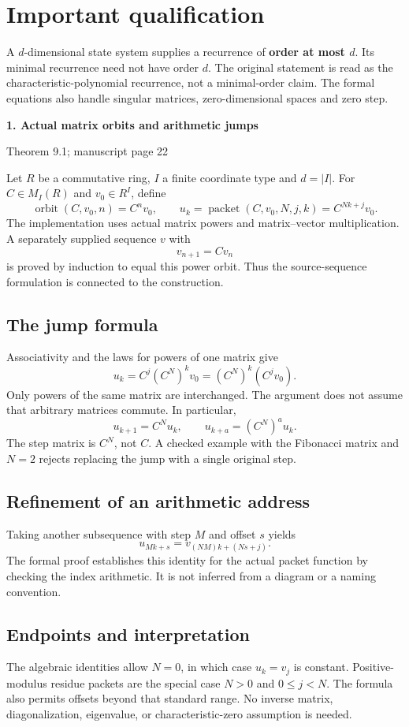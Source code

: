 \documentclass[11pt]{article}
\newcommand{\pageheading}[2]{{\Large\bfseries\color{ink}#1}\par{\small #2}\par\medskip}
\begin{document}
\section*{Important qualification}
A $d$-dimensional state system supplies a recurrence of \textbf{order at most $d$}. Its minimal recurrence need not have order $d$. The original statement is read as the characteristic-polynomial recurrence, not a minimal-order claim. The formal equations also handle singular matrices, zero-dimensional spaces and zero step.

\newpage
\pageheading{1. Actual matrix orbits and arithmetic jumps}{Theorem 9.1; manuscript page 22}
Let $R$ be a commutative ring, $I$ a finite coordinate type and $d=|I|$. For $C\in M_I(R)$ and $v_0\in R^I$, define
\[
 \operatorname{orbit}(C,v_0,n)=C^nv_0,
 \qquad u_k=\operatorname{packet}(C,v_0,N,j,k)=C^{Nk+j}v_0.
\]
The implementation uses actual matrix powers and matrix--vector multiplication. A separately supplied sequence $v$ with
\[
 v_{n+1}=Cv_n
\]
is proved by induction to equal this power orbit. Thus the source-sequence formulation is connected to the construction.

\subsection*{The jump formula}
Associativity and the laws for powers of one matrix give
\[
 \boxed{u_k=C^j(C^N)^kv_0=(C^N)^k(C^jv_0).}
\]
Only powers of the same matrix are interchanged. The argument does not assume that arbitrary matrices commute. In particular,
\[
 u_{k+1}=C^Nu_k,\qquad u_{k+a}=(C^N)^a u_k.
\]
The step matrix is $C^N$, not $C$. A checked example with the Fibonacci matrix and $N=2$ rejects replacing the jump with a single original step.

\subsection*{Refinement of an arithmetic address}
Taking another subsequence with step $M$ and offset $s$ yields
\[
 u_{Mk+s}=v_{(NM)k+(Ns+j)}.
\]
The formal proof establishes this identity for the actual packet function by checking the index arithmetic. It is not inferred from a diagram or a naming convention.

\subsection*{Endpoints and interpretation}
The algebraic identities allow $N=0$, in which case $u_k=v_j$ is constant. Positive-modulus residue packets are the special case $N>0$ and $0\le j<N$. The formula also permits offsets beyond that standard range. No inverse matrix, diagonalization, eigenvalue, or characteristic-zero assumption is needed.
\end{document}
